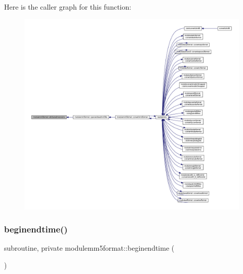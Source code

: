 Here is the caller graph for this function\+:\nopagebreak
\begin{figure}[H]
\begin{center}
\leavevmode
\includegraphics[width=350pt]{namespacemodulemm5format_a0c0413b1da7f8da860aef9b811b0c725_icgraph}
\end{center}
\end{figure}
\mbox{\label{namespacemodulemm5format_a0c8ad12e555e63fe83da5b09ae5e7126}} 
\subsubsection{\texorpdfstring{beginendtime()}{beginendtime()}}
{\footnotesize\ttfamily subroutine, private modulemm5format\+::beginendtime (\begin{DoxyParamCaption}{ }\end{DoxyParamCaption})\hspace{0.3cm}{\ttfamily [private]}}

